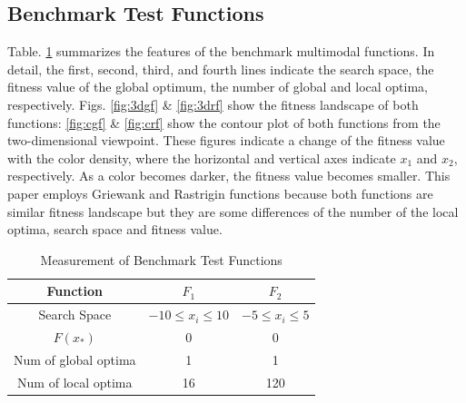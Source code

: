 \documentclass{ies2018}
\begin{document}
\subsection{Benchmark Test Functions}
Table. \ref{tab1} summarizes the features of the benchmark multimodal functions. In detail, the first, second, third, and fourth lines indicate the search space, the fitness value of the global optimum, the number of global and local optima, respectively. Figs. \ref{fig:3dgf} \& \ref{fig:3drf} show the fitness landscape of both functions: \ref{fig:cgf} \& \ref{fig:crf} show the contour plot of  both functions from the two-dimensional viewpoint. These figures indicate a change of the fitness value with the color density, where the horizontal and vertical axes indicate $x_1$ and $x_2$, respectively. As a color becomes darker, the fitness value becomes smaller. This paper employs Griewank and Rastrigin functions because both functions are similar fitness landscape but they are some differences of the number of the local optima, search space and fitness value.  

\begin{table}[h]
\caption{Measurement of Benchmark Test Functions}
\begin{center}
\begin{tabular}{c|c|c}
\hline
Function & ${F_1}$ & ${F_2}$ \\
\hline
Search Space & $-10 \leq x_i \leq 10$ & $-5 \leq x_i \leq 5$ \\
\hline
$F(x_*)$ & 0 & 0   \\
\hline
Num of global optima & 1 & 1  \\
\hline
Num of local optima &  16 & 120   \\
\hline
\end{tabular}
\label{tab1}
\end{center}
\end{table}
\end{document}
